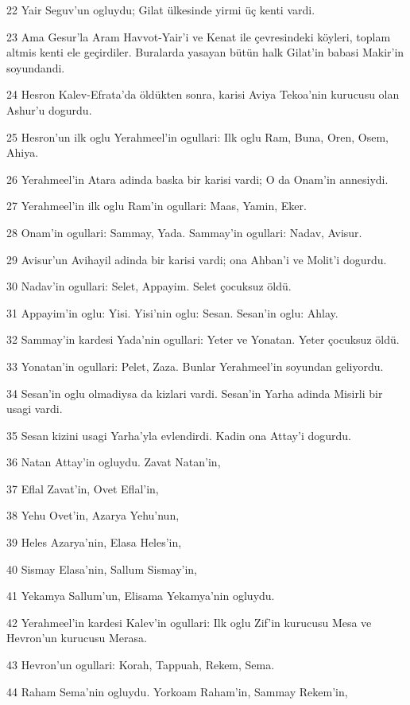 \par 22 Yair Seguv'un ogluydu; Gilat ülkesinde yirmi üç kenti vardi.
\par 23 Ama Gesur'la Aram Havvot-Yair'i ve Kenat ile çevresindeki köyleri, toplam altmis kenti ele geçirdiler. Buralarda yasayan bütün halk Gilat'in babasi Makir'in soyundandi.
\par 24 Hesron Kalev-Efrata'da öldükten sonra, karisi Aviya Tekoa'nin kurucusu olan Ashur'u dogurdu.
\par 25 Hesron'un ilk oglu Yerahmeel'in ogullari: Ilk oglu Ram, Buna, Oren, Osem, Ahiya.
\par 26 Yerahmeel'in Atara adinda baska bir karisi vardi; O da Onam'in annesiydi.
\par 27 Yerahmeel'in ilk oglu Ram'in ogullari: Maas, Yamin, Eker.
\par 28 Onam'in ogullari: Sammay, Yada. Sammay'in ogullari: Nadav, Avisur.
\par 29 Avisur'un Avihayil adinda bir karisi vardi; ona Ahban'i ve Molit'i dogurdu.
\par 30 Nadav'in ogullari: Selet, Appayim. Selet çocuksuz öldü.
\par 31 Appayim'in oglu: Yisi. Yisi'nin oglu: Sesan. Sesan'in oglu: Ahlay.
\par 32 Sammay'in kardesi Yada'nin ogullari: Yeter ve Yonatan. Yeter çocuksuz öldü.
\par 33 Yonatan'in ogullari: Pelet, Zaza. Bunlar Yerahmeel'in soyundan geliyordu.
\par 34 Sesan'in oglu olmadiysa da kizlari vardi. Sesan'in Yarha adinda Misirli bir usagi vardi.
\par 35 Sesan kizini usagi Yarha'yla evlendirdi. Kadin ona Attay'i dogurdu.
\par 36 Natan Attay'in ogluydu. Zavat Natan'in,
\par 37 Eflal Zavat'in, Ovet Eflal'in,
\par 38 Yehu Ovet'in, Azarya Yehu'nun,
\par 39 Heles Azarya'nin, Elasa Heles'in,
\par 40 Sismay Elasa'nin, Sallum Sismay'in,
\par 41 Yekamya Sallum'un, Elisama Yekamya'nin ogluydu.
\par 42 Yerahmeel'in kardesi Kalev'in ogullari: Ilk oglu Zif'in kurucusu Mesa ve Hevron'un kurucusu Merasa.
\par 43 Hevron'un ogullari: Korah, Tappuah, Rekem, Sema.
\par 44 Raham Sema'nin ogluydu. Yorkoam Raham'in, Sammay Rekem'in,
